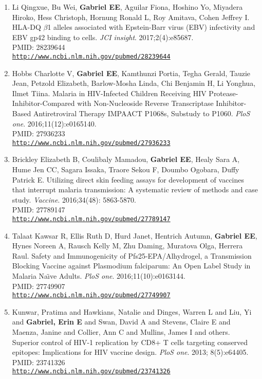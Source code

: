 \documentclass[12pt]{article}
\providecommand \url[1]{\href{#1}{#1}}
\renewcommand*\url[1]{\href{#1}{\texttt{#1}}}
\begin{document}
\begin{enumerate}
\item	Li  Qingxue, Bu  Wei, \textbf{Gabriel  EE}, Aguilar  Fiona, Hoshino  Yo, Miyadera  Hiroko, Hess  Christoph, Hornung  Ronald L, Roy  Amitava, Cohen  Jeffrey I.	HLA-DQ $\beta$1 alleles associated with Epstein-Barr virus (EBV) infectivity and EBV gp42 binding to cells. \emph{JCI insight}. 2017;2(4):e85687.\\
PMID: 28239644\\
\url{http://www.ncbi.nlm.nih.gov/pubmed/28239644}


\item	Hobbs  Charlotte V, \textbf{Gabriel  EE}, Kamthunzi  Portia, Tegha  Gerald, Tauzie  Jean, Petzold  Elizabeth, Barlow-Mosha  Linda, Chi  Benjamin H, Li  Yonghua, Ilmet  Tiina. Malaria in HIV-Infected Children Receiving HIV Protease-Inhibitor-Compared with Non-Nucleoside Reverse Transcriptase Inhibitor-Based Antiretroviral Therapy  IMPAACT P1068s,  Substudy to P1060. \emph{PloS one}. 2016;11(12):e0165140.\\
PMID: 27936233\\
\url{http://www.ncbi.nlm.nih.gov/pubmed/27936233}

\item	Brickley  Elizabeth B, Coulibaly  Mamadou, \textbf{Gabriel  EE}, Healy  Sara A, Hume  Jen CC, Sagara  Issaka, Traore  Sekou F, Doumbo  Ogobara, Duffy  Patrick E. Utilizing direct skin feeding assays for development of vaccines that interrupt malaria transmission: A systematic review of methods and case study. \emph{Vaccine}. 2016;34(48): 5863-5870.\\
PMID: 27789147\\
\url{http://www.ncbi.nlm.nih.gov/pubmed/27789147}

\item	Talaat  Kawsar R, Ellis  Ruth D, Hurd  Janet, Hentrich  Autumn, \textbf{Gabriel  EE}, Hynes  Noreen A, Rausch  Kelly M, Zhu  Daming, Muratova  Olga, Herrera  Raul. Safety and Immunogenicity of Pfs25-EPA/Alhydrogel{\textregistered}, a Transmission Blocking Vaccine against Plasmodium falciparum: An Open Label Study in Malaria Na{\"\i}ve Adults. \emph{PloS one}. 2016;11(10):e0163144.\\	PMID: 27749907 \\
\url{http://www.ncbi.nlm.nih.gov/pubmed/27749907}


\item Kunwar, Pratima and Hawkians, Natalie and Dinges, Warren L and Liu, Yi and \textbf{Gabriel, Erin E} and Swan, David A and Stevens, Claire E and Maenza, Janine and Collier, Ann C and Mullins, James I and others. Superior control of HIV-1 replication by CD8+ T cells targeting conserved epitopes: Implications for HIV vaccine design. \emph{PloS one}. 2013; 8(5):e64405.\\
PMID: 23741326 \\
\url{http://www.ncbi.nlm.nih.gov/pubmed/23741326}





\end{enumerate}
\end{document}
